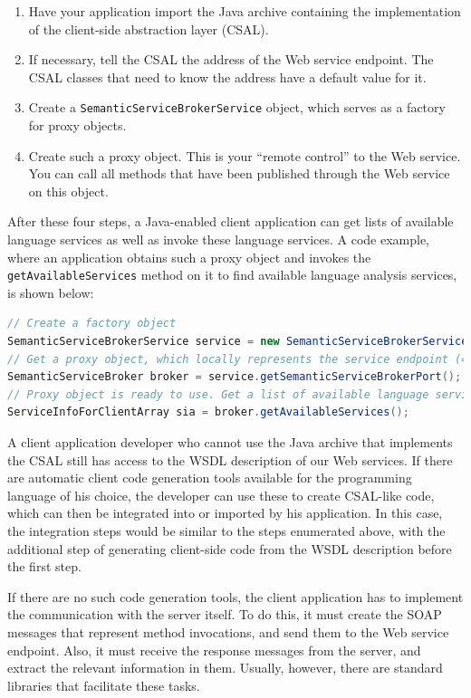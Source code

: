 \begin{enumerate}
\item Have your application import the Java archive containing the
    implementation of the client-side abstraction layer (CSAL).

\item If necessary, tell the CSAL the address of the Web service
    endpoint. The CSAL classes that need to know the address have a
    default value for it.

\item Create a \texttt{SemanticServiceBrokerService} object, which
    serves as a factory for proxy objects.

\item Create such a proxy object. This is your ``remote control'' to
    the Web service. You can call all methods that have been published
    through the Web service on this object.
\end{enumerate}

After these four steps, a Java-enabled client application can get
lists of available language services as well as invoke these language
services. A code example, where an application obtains such a proxy
object and invokes the \texttt{getAvailableServices} method on it to
find available language analysis services, is shown below:

\begin{lstlisting}[language=Java,xleftmargin=4mm,columns=flexible]
// Create a factory object
SemanticServiceBrokerService service = new SemanticServiceBrokerService();
// Get a proxy object, which locally represents the service endpoint (= port)
SemanticServiceBroker broker = service.getSemanticServiceBrokerPort();
// Proxy object is ready to use. Get a list of available language services.
ServiceInfoForClientArray sia = broker.getAvailableServices();
\end{lstlisting}

A client application developer who cannot use the Java archive that
implements the CSAL still has access to the WSDL description of our
Web services. If there are automatic client code generation tools
available for the programming language of his choice, the developer
can use these to create CSAL-like code, which can then be integrated
into or imported by his application. In this case, the integration
steps would be similar to the steps enumerated above, with the
additional step of generating client-side code from the WSDL
description before the first step.

If there are no such code generation tools, the client application has
to implement the communication with the server itself. To do this, it
must create the SOAP messages that represent method invocations, and
send them to the Web service endpoint. Also, it must receive the
response messages from the server, and extract the relevant
information in them. Usually, however, there are standard libraries
that facilitate these tasks.

